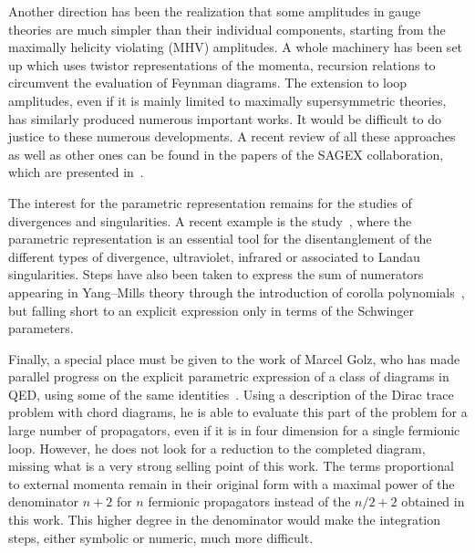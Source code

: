 \documentclass[pdftex]{sigma}
\numberwithin{equation}{section}
\begin{document}
Another direction has been the realization that some amplitudes in gauge theories are much simpler
than their individual components, starting from the maximally helicity violating (MHV) amplitudes. A
whole machinery has been set up which uses twistor representations of the momenta, recursion relations
to circumvent the evaluation of Feynman diagrams. The extension to loop amplitudes, even if it is
mainly limited to maximally supersymmetric theories, has similarly produced numerous important works.
It would be difficult to do justice to these numerous developments. A recent review of all these approaches as well as other ones can be found
in the papers of the SAGEX collaboration, which are presented in~\cite{sagex}.

The interest for the parametric representation remains for the studies of divergences and singularities. A recent example
is the study~\cite{GKNT23}, where the parametric representation is an essential tool for the disentanglement of the different types of divergence,
ultraviolet, infrared or associated to Landau singularities. Steps have also been taken to express the sum of numerators appearing in Yang--Mills
theory through the introduction of corolla polynomials~\cite{KrSaSu12}, but falling short to an explicit expression only in terms of
the Schwinger parameters.

Finally, a special place must be given to the work of Marcel Golz, who has made parallel progress on the explicit
parametric expression of a class of diagrams in QED, using some of the same identities~\cite{Go2019}. Using a
description of the Dirac trace problem with chord diagrams, he is able to evaluate this part of the problem for
a large number of propagators, even if it is in four dimension for a single fermionic loop. However, he does not look
for a reduction to the completed diagram, missing what is a very strong selling point of this work. The terms proportional
to external momenta remain in their
original form with a maximal power of the denominator $n+2$ for $n$ fermionic propagators instead of the
$n/2+2$ obtained in this work. This higher degree in the denominator would make the integration steps, either symbolic or numeric, much more
difficult.
\end{document}
